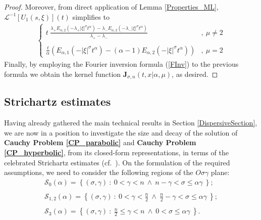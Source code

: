 \documentclass{amsart}
\theoremstyle{definition}
\theoremstyle{remark}
\numberwithin{equation}{section}
\begin{document}
\begin{proof}
			Moreover, from direct application of Lemma \ref{Properties_ML},  $\mathcal{L}^{-1}[U_1(s,\xi)](t)$ simplifies to
			\begin{eqnarray}\label{U1LaplaceInverse}
					\begin{cases}
						\displaystyle 	t~\frac{\lambda_+E_{\alpha,2}(-\lambda_+|\xi|^\sigma t^\alpha)-\lambda_-E_{\alpha,2}(-\lambda_-|\xi|^\sigma t^\alpha)}{\lambda_+-\lambda_-}&,~\mu\neq 2 \\ \ \\
						\displaystyle \frac{t}{\alpha}\left(E_{\alpha,1}(-|\xi|^\sigma t^\alpha)-(\alpha-1)E_{\alpha,2}(-|\xi|^\sigma t^\alpha)\right)&,~\mu= 2
					\end{cases} 
			\end{eqnarray}
			Finally, by employing the Fourier inversion formula (\ref{FInv}) to the previous formula we obtain the kernel function ${\bm J}_{\sigma,n}(t,x|\alpha,\mu)$, as desired.
		\end{proof}
		
		\subsection{Strichartz estimates}\label{StrichartzSection}
		
		
		
		Having already gathered the main technical results in Section \ref{DispersiveSection}, we are now in a position to investigate the size and decay of the solution of {\bf Cauchy Problem \ref{CP_parabolic}} and {\bf Cauchy Problem \ref{CP_hyperbolic}}, from its closed-form representations, in terms of the celebrated Strichartz estimates (cf.~\cite[Chapter 2.]{Tao06}).
		On the formulation of the required assumptions, we need to consider the following regions of the
		$O\sigma\gamma$ plane:
		\begin{eqnarray}
			\label{S0-region}
			\mathcal{S}_0(\alpha)=\left\{(\sigma,\gamma)~:~0<\gamma< n~\wedge~n-\gamma<\sigma\leq \alpha\gamma~\right\};\\ \nonumber \\
			\label{S12-region}	\mathcal{S}_{1,2}(\alpha)=\left\{(\sigma,\gamma)~:~\displaystyle 0<\gamma< \frac{n}{2}~\wedge~\displaystyle \frac{n}{2}-\gamma<\sigma\leq \alpha\gamma~\right\};\\ \nonumber \\
			\label{S3-region}
			\mathcal{S}_{3}(\alpha)=\left\{(\sigma,\gamma)~:~\displaystyle \frac{n}{2}\leq \gamma< n~\wedge~0<\sigma\leq \alpha\gamma~\right\}.
		\end{eqnarray}		
		
\end{document}
